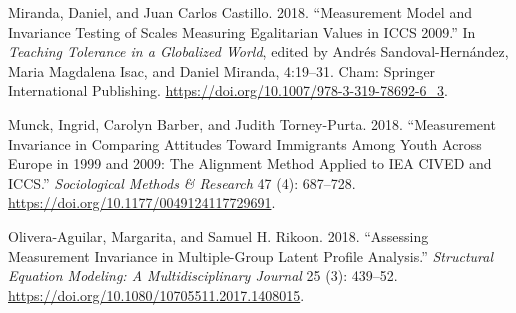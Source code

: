 \documentclass[
      11pt,
                      ]{article}
\begin{document}
\begin{CSLReferences}{1}{0}
\leavevmode\hypertarget{ref-sandoval-hernandez_measurement_2018}{}%
Miranda, Daniel, and Juan Carlos Castillo. 2018. {``Measurement {Model}
and {Invariance} {Testing} of {Scales} {Measuring} {Egalitarian}
{Values} in {ICCS} 2009.''} In \emph{Teaching {Tolerance} in a
{Globalized} {World}}, edited by Andrés Sandoval-Hernández, Maria
Magdalena Isac, and Daniel Miranda, 4:19--31. Cham: Springer
International Publishing.
\url{https://doi.org/10.1007/978-3-319-78692-6_3}.

\leavevmode\hypertarget{ref-munck_measurement_2018}{}%
Munck, Ingrid, Carolyn Barber, and Judith Torney-Purta. 2018.
{``Measurement {Invariance} in {Comparing} {Attitudes} {Toward}
{Immigrants} {Among} {Youth} {Across} {Europe} in 1999 and 2009: {The}
{Alignment} {Method} {Applied} to {IEA} {CIVED} and {ICCS}.''}
\emph{Sociological Methods \& Research} 47 (4): 687--728.
\url{https://doi.org/10.1177/0049124117729691}.

\leavevmode\hypertarget{ref-olivera-aguilar_assessing_2018}{}%
Olivera-Aguilar, Margarita, and Samuel H. Rikoon. 2018. {``Assessing
{Measurement} {Invariance} in {Multiple}-{Group} {Latent} {Profile}
{Analysis}.''} \emph{Structural Equation Modeling: A Multidisciplinary
Journal} 25 (3): 439--52.
\url{https://doi.org/10.1080/10705511.2017.1408015}.

\end{CSLReferences}
\end{document}
